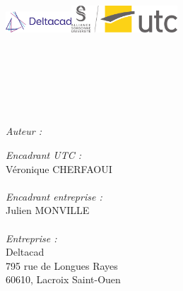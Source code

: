 
\makeatletter
  \begin{titlepage}
    \centering
    \noindent\includegraphics[height=0.8cm]{ressources/images/deltacad_logo.png}\hfill\includegraphics[height=1cm]{ressources/images/utc_logo.png}\\
    \vfill

    \textsc{\Large \reporttitle}\\[0.5cm]
    \HRule \\[0.4cm]
    {\huge \bfseries \reportsubject}\\[0.5cm]
    \HRule \\[1.5cm]
    \textsc{\large \reportdates}\\[0.5cm]

    \vfill

    \begin{minipage}[t]{0.3\textwidth}
      \begin{flushleft} \large
        \emph{Auteur :}\\
        \reportauthor
      \end{flushleft}
    \end{minipage}
    \begin{minipage}[t]{0.6\textwidth}
      \begin{flushright} \large
        \emph{Encadrant UTC :} \\
		Véronique \textsc{CHERFAOUI} \\
        ~\\
		\emph{Encadrant entreprise :} \\
		Julien \textsc{MONVILLE} \\
        ~\\
        \emph{Entreprise :} \\
		Deltacad\\
        795 rue de Longues Rayes\\
        60610, Lacroix Saint-Ouen\\
      \end{flushright}
    \end{minipage}
  \end{titlepage}

\makeatother